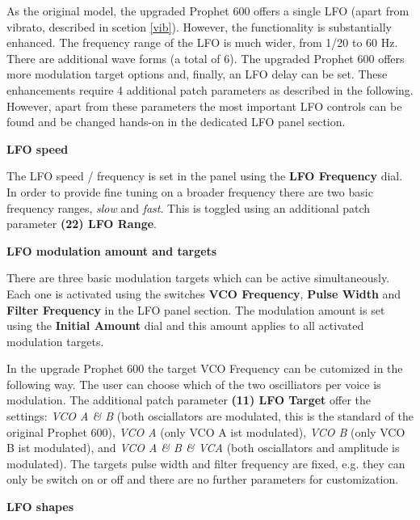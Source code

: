 As the original model, the upgraded Prophet 600 offers a single LFO (apart from vibrato, described in scetion \ref{vib}). However, the functionality is substantially enhanced. The frequency range of the LFO is much wider, from 1/20 to 60 Hz. There are additional wave forms (a total of 6). The upgraded Prophet 600 offers more modulation target options and, finally, an LFO delay can be set. These enhancements require 4 additional patch parameters as described in the following. However, apart from these parameters the most important LFO controls can be found and be changed hands-on in the dedicated LFO panel section. 


\begin{center}
\end{center}

\textbf{LFO speed}

The LFO speed / frequency is set in the panel using the \textbf{LFO Frequency} dial. In order to provide fine tuning on a broader frequency there are two basic frequency ranges, \textit{slow} and \textit{fast}. This is toggled using an additional patch parameter \textbf{(22) LFO Range}. 

\textbf{LFO modulation amount and targets}

There are three basic modulation targets which can be active simultaneously. Each one is activated using the switches \textbf{VCO Frequency}, \textbf{Pulse Width} and \textbf{Filter Frequency} in the LFO panel section. The modulation amount is set using the \textbf{Initial Amount} dial and this amount applies to all activated modulation targets. 

In the upgrade Prophet 600 the target VCO Frequency can be cutomized in the following way. The user can choose which of the two oscilliators per voice is modulation. The additional patch parameter \textbf{(11) LFO Target} offer the settings: \textit{VCO A \& B} (both osciallators are modulated, this is the standard of the original Prophet 600), \textit{VCO A} (only VCO A ist modulated), \textit{VCO B} (only VCO B ist modulated),  and \textit{VCO A \& B \& VCA} (both osciallators and amplitude is modulated). The targets pulse width and filter frequency are fixed, e.g. they can only be switch on or off and there are no further parameters for customization.

\textbf{LFO shapes}

